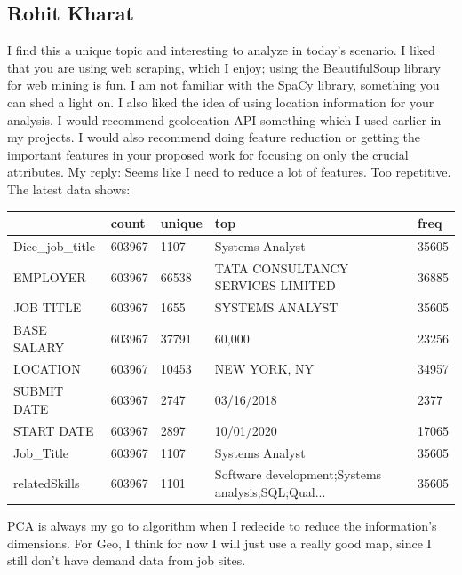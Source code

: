 \subsection*{Rohit Kharat}
I find this a unique topic and interesting to analyze in today's scenario. I liked that you are using web scraping, which I enjoy; using the BeautifulSoup library for web mining is fun. I am not familiar with the SpaCy library, something you can shed a light on. I also liked the idea of using location information for your analysis. I would recommend geolocation API something which I used earlier in my projects. I would also recommend doing feature reduction or getting the important features in your proposed work for focusing on only the crucial attributes. 
My reply: Seems like I need to reduce a lot of features. Too repetitive. The latest data shows:
\begin{table}[h!]

	\resizebox{\columnwidth}{!}
	{%
		
		\begin{tabular}{lllll}
			\hline
			{} &   count & unique &                                                top &   freq \\
			\hline
			Dice\_job\_title &  603967 &   1107 &                                    Systems Analyst &  35605 \\
			EMPLOYER       &  603967 &  66538 &                  TATA CONSULTANCY SERVICES LIMITED &  36885 \\
			JOB TITLE      &  603967 &   1655 &                                    SYSTEMS ANALYST &  35605 \\
			BASE SALARY    &  603967 &  37791 &                                             60,000 &  23256 \\
			LOCATION       &  603967 &  10453 &                                       NEW YORK, NY &  34957 \\
			SUBMIT DATE    &  603967 &   2747 &                                         03/16/2018 &   2377 \\
			START DATE     &  603967 &   2897 &                                         10/01/2020 &  17065 \\
			Job\_Title      &  603967 &   1107 &                                    Systems Analyst &  35605 \\
			relatedSkills  &  603967 &   1101 &  Software development;Systems analysis;SQL;Qual... &  35605 \\
			\hline
		\end{tabular}
		
	}
PCA is always my go to algorithm when I redecide to reduce the information's dimensions. For Geo, I think for now I will just use a really good map, since I still don't have demand data from job sites. 
\end{table}
